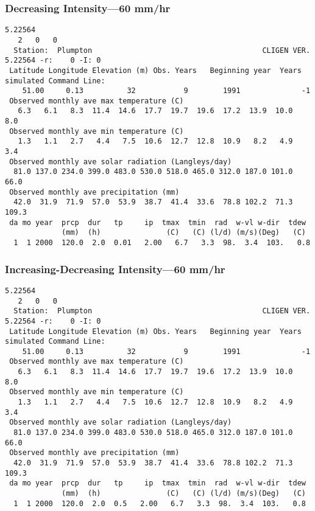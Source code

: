 \subsubsection{Decreasing Intensity---60 mm/hr}
\label{sec:DecreasingIntensity60MmHr}

\begin{verbatim}
5.22564
   2   0   0
  Station:  Plumpton                                       CLIGEN VER. 5.22564 -r:    0 -I: 0
 Latitude Longitude Elevation (m) Obs. Years   Beginning year  Years simulated Command Line:
    51.00     0.13          32           9        1991              -1
 Observed monthly ave max temperature (C)
   6.3   6.1   8.3  11.4  14.6  17.7  19.7  19.6  17.2  13.9  10.0   8.0
 Observed monthly ave min temperature (C)
   1.3   1.1   2.7   4.4   7.5  10.6  12.7  12.8  10.9   8.2   4.9   3.4
 Observed monthly ave solar radiation (Langleys/day)
  81.0 137.0 234.0 399.0 483.0 530.0 518.0 465.0 312.0 187.0 101.0  66.0
 Observed monthly ave precipitation (mm)
  42.0  31.9  71.9  57.0  53.9  38.7  41.4  33.6  78.8 102.2  71.3 109.3
 da mo year  prcp  dur   tp     ip  tmax  tmin  rad  w-vl w-dir  tdew
             (mm)  (h)               (C)   (C) (l/d) (m/s)(Deg)   (C)
  1  1 2000  120.0  2.0  0.01   2.00   6.7   3.3  98.  3.4  103.   0.8
\end{verbatim}

\subsubsection{Increasing-Decreasing Intensity---60 mm/hr}
\label{sec:IncreasingDecreasingIntensity60MmHr}

\begin{verbatim}
5.22564
   2   0   0
  Station:  Plumpton                                       CLIGEN VER. 5.22564 -r:    0 -I: 0
 Latitude Longitude Elevation (m) Obs. Years   Beginning year  Years simulated Command Line:
    51.00     0.13          32           9        1991              -1
 Observed monthly ave max temperature (C)
   6.3   6.1   8.3  11.4  14.6  17.7  19.7  19.6  17.2  13.9  10.0   8.0
 Observed monthly ave min temperature (C)
   1.3   1.1   2.7   4.4   7.5  10.6  12.7  12.8  10.9   8.2   4.9   3.4
 Observed monthly ave solar radiation (Langleys/day)
  81.0 137.0 234.0 399.0 483.0 530.0 518.0 465.0 312.0 187.0 101.0  66.0
 Observed monthly ave precipitation (mm)
  42.0  31.9  71.9  57.0  53.9  38.7  41.4  33.6  78.8 102.2  71.3 109.3
 da mo year  prcp  dur   tp     ip  tmax  tmin  rad  w-vl w-dir  tdew
             (mm)  (h)               (C)   (C) (l/d) (m/s)(Deg)   (C)
  1  1 2000  120.0  2.0  0.5   2.00   6.7   3.3  98.  3.4  103.   0.8
\end{verbatim}


